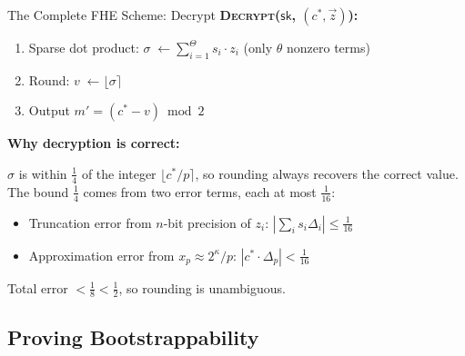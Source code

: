 \documentclass[10pt,handout]{beamer}
\begin{document}
\begin{frame}{The Complete FHE Scheme: Decrypt}
    \textbf{\textsc{Decrypt}($\mathsf{sk}$,\; $(c^*, \vec{z})$):}
    \begin{enumerate}
        \item Sparse dot product:
              $\sigma \;\leftarrow \displaystyle\sum_{i=1}^\Theta s_i \cdot z_i$
              \hfill{\small(only $\theta$ nonzero terms)}
        \item Round: $v \;\leftarrow \lfloor \sigma \rceil$
        \item Output $m' = (c^* - v) \bmod 2$
    \end{enumerate}

    \vspace{0.4cm}
    \textbf{Why decryption is correct:}

    $\sigma$ is within $\tfrac{1}{4}$ of the integer $\lfloor c^*/p \rceil$,
    so rounding always recovers the correct value. The bound $\tfrac{1}{4}$
    comes from two error terms, each at most $\tfrac{1}{16}$:
    \begin{itemize}
        \item Truncation error from $n$-bit precision of $z_i$:
              $|\sum_i s_i \Delta_i| \leq \tfrac{1}{16}$
        \item Approximation error from $x_p \approx 2^\kappa/p$:
              $|c^* \cdot \Delta_p| < \tfrac{1}{16}$
    \end{itemize}

    \vspace{0.2cm}
    Total error $< \tfrac{1}{8} < \tfrac{1}{2}$, so rounding is unambiguous.
\end{frame}

\subsection{Proving Bootstrappability}
\end{document}
